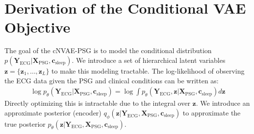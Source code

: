 \documentclass[11pt,en]{elegantpaper}
\begin{document}
\printbibliography[heading=bibintoc, title=\ebibname]

\appendix
\addappheadtotoc

\section{Derivation of the Conditional VAE Objective}
\label{app:elbo_derivation}

The goal of the cNVAE-PSG is to model the conditional distribution $p(\mathbf{Y}_{\text{ECG}} | \mathbf{X}_{\text{PSG}}, \mathbf{c}_{\text{sleep}})$. We introduce a set of hierarchical latent variables $\mathbf{z} = \{\mathbf{z}_1, \dots, \mathbf{z}_L\}$ to make this modeling tractable. The log-likelihood of observing the ECG data given the PSG and clinical conditions can be written as:
\begin{align}
\log p_\theta(\mathbf{Y}_{\text{ECG}} | \mathbf{X}_{\text{PSG}}, \mathbf{c}_{\text{sleep}}) = \log \int p_\theta(\mathbf{Y}_{\text{ECG}}, \mathbf{z} | \mathbf{X}_{\text{PSG}}, \mathbf{c}_{\text{sleep}}) d\mathbf{z}
\end{align}
Directly optimizing this is intractable due to the integral over $\mathbf{z}$. We introduce an approximate posterior (encoder) $q_\phi(\mathbf{z} | \mathbf{Y}_{\text{ECG}}, \mathbf{X}_{\text{PSG}}, \mathbf{c}_{\text{sleep}})$ to approximate the true posterior $p_\theta(\mathbf{z} | \mathbf{Y}_{\text{ECG}}, \mathbf{X}_{\text{PSG}}, \mathbf{c}_{\text{sleep}})$.
\end{document}
